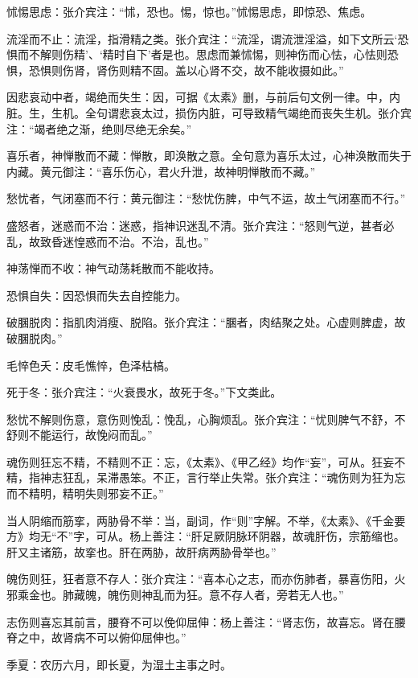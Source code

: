 \documentclass[12pt]{ctexbook}
\begin{document}

\begin{jiaozhu}
	\item 怵惕思虑：张介宾注：“怵，恐也。惕，惊也。”怵惕思虑，即惊恐、焦虑。
	\item 流淫而不止：流淫，指滑精之类。张介宾注：“流淫，谓流泄淫溢，如下文所云‘恐惧而不解则伤精’、‘精时自下’者是也。思虑而兼怵惕，则神伤而心怯，心怯则恐惧，恐惧则伤肾，肾伤则精不固。盖以心肾不交，故不能收摄如此。”
	\item 因悲哀动中者，竭绝而失生：因，可据《太素》删，与前后句文例一律。中，内脏。生，生机。全句谓悲哀太过，损伤内脏，可导致精气竭绝而丧失生机。张介宾注：“竭者绝之渐，绝则尽绝无余矣。”
	\item 喜乐者，神惮散而不藏：惮散，即涣散之意。全句意为喜乐太过，心神涣散而失于内藏。黄元御注：“喜乐伤心，君火升泄，故神明惮散而不藏。”
	\item 愁忧者，气闭塞而不行：黄元御注：“愁忧伤脾，中气不运，故土气闭塞而不行。”
	\item 盛怒者，迷惑而不治：迷惑，指神识迷乱不清。张介宾注：“怒则气逆，甚者必乱，故致昏迷惶惑而不治。不治，乱也。”
	\item 神荡惮而不收：神气动荡耗散而不能收持。
	\item 恐惧自失：因恐惧而失去自控能力。
	\item 破䐃脱肉：指肌肉消瘦、脱陷。张介宾注：“䐃者，肉结聚之处。心虚则脾虚，故破䐃脱肉。”
	\item 毛悴色夭：皮毛憔悴，色泽枯槁。
	\item 死于冬：张介宾注：“火衰畏水，故死于冬。”下文类此。
	\item 愁忧不解则伤意，意伤则悗乱：悗乱，心胸烦乱。张介宾注：“忧则脾气不舒，不舒则不能运行，故悗闷而乱。”
	\item 魂伤则狂忘不精，不精则不正：忘，《太素》、《甲乙经》均作“妄”，可从。狂妄不精，指神志狂乱，呆滞愚笨。不正，言行举止失常。张介宾注：“魂伤则为狂为忘而不精明，精明失则邪妄不正。”
	\item 当人阴缩而筋挛，两胁骨不举：当，副词，作“则”字解。不举，《太素》、《千金要方》均无“不”字，可从。杨上善注：“肝足厥阴脉环阴器，故魂肝伤，宗筋缩也。肝又主诸筋，故挛也。肝在两胁，故肝病两胁骨举也。”
	\item 魄伤则狂，狂者意不存人：张介宾注：“喜本心之志，而亦伤肺者，暴喜伤阳，火邪乘金也。肺藏魄，魄伤则神乱而为狂。意不存人者，旁若无人也。”
	\item 志伤则喜忘其前言，腰脊不可以俛仰屈伸：杨上善注：“肾志伤，故喜忘。肾在腰脊之中，故肾病不可以俯仰屈伸也。”
	\item 季夏：农历六月，即长夏，为湿土主事之时。

\end{jiaozhu}
\end{document}
